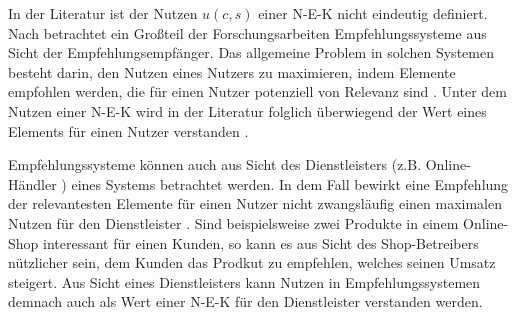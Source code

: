 In der Literatur ist der Nutzen $u(c,s)$ einer \ac{N-E-K} nicht eindeutig definiert.
Nach \textcite[S. 1]{jannach:article} betrachtet ein Großteil der Forschungsarbeiten Empfehlungssysteme aus Sicht der Empfehlungsempfänger.
Das allgemeine Problem in solchen Systemen besteht darin, den Nutzen eines Nutzers zu maximieren, indem Elemente empfohlen werden, die für einen Nutzer potenziell von Relevanz sind \cite[S. 1]{jannach:article}.
Unter dem Nutzen einer \ac{N-E-K} wird in der Literatur folglich überwiegend der Wert eines Elements für einen Nutzer verstanden \cite[S. 10f.]{ricci:inbook}\cite[S. 1]{klahold:book}\cite[S. 735]{adomavicius:inproceedings}.

Empfehlungssysteme können auch aus Sicht des Dienstleisters (z.B. Online-Händler \cite[S. 1]{jannach:article}\cite[S. 1]{das:article}) eines Systems betrachtet werden.
In dem Fall bewirkt eine Empfehlung der relevantesten Elemente für einen Nutzer nicht zwangsläufig einen maximalen Nutzen für den Dienstleister \cite[S. 1]{jannach:article}.
Sind beispielsweise zwei Produkte in einem Online-Shop interessant für einen Kunden, so kann es aus Sicht des Shop-Betreibers nützlicher sein, dem Kunden das Prodkut zu empfehlen, welches seinen Umsatz steigert.
Aus Sicht eines Dienstleisters kann Nutzen in Empfehlungssystemen demnach auch als Wert einer \ac{N-E-K} für den Dienstleister verstanden werden.

